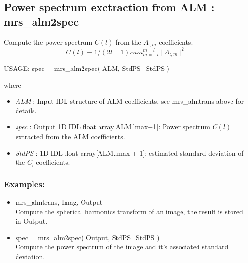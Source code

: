 \subsection{Power spectrum exctraction from ALM : mrs\_alm2spec}
Compute the power spectrum $C(l)$ from the $A_{l,m}$ coefficients.
\begin{equation}
C(l) = 1/(2l+1) sum_{m=-l}^{m=l} \mid A_{l,m} \mid^2
\end{equation}
{\bf
\begin{center}
     USAGE: spec = mrs\_alm2spec( ALM, StdPS=StdPS )
\end{center}}
where
\begin{itemize}
\item {\em ALM} : Input IDL structure of ALM coefficients, see mrs\_almtrans above for details.
\item {\em spec} : Output 1D IDL float array[ALM.lmax+1]: Power spectrum $C(l)$ extracted from the ALM coefficients.
\item {\em StdPS} : 1D IDL float array[ALM.lmax + 1]: estimated standard deviation of the $C_l$ coefficients.
\end{itemize}

\subsubsection*{Examples:} 
\begin{itemize}
\item mrs\_almtrans, Imag, Output \\
Compute the spherical harmonics transform of an image, the result is stored in Output.
\item spec = mrs\_alm2spec( Output, StdPS=StdPS ) \\
Compute the power spectrum of the image and it's associated standard deviation.
\end{itemize}



